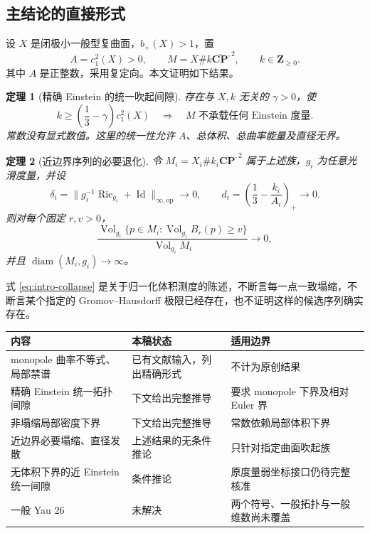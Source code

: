 \documentclass[UTF8,fontset=fandol,zihao=-4]{ctexart}
\theoremstyle{cn}
\newtheorem{theorem}{定理}[section]
\DeclareMathOperator{\Ric}{Ric}
\DeclareMathOperator{\Vol}{Vol}
\DeclareMathOperator{\diam}{diam}
\DeclareMathOperator{\Id}{Id}
\newcommand{\op}{\mathrm{op}}
\numberwithin{equation}{section}
\begin{document}
\subsection{主结论的直接形式}

设 $X$ 是闭极小一般型复曲面，$b_+(X)>1$，置
\[
A=c_1^2(X)>0,\qquad M=X\#k\overline{\mathbf{CP}}^{,2},\qquad k\in\mathbf Z_{\ge0}.
\]
其中 $A$ 是正整数，采用复定向。本文证明如下结果。

\begin{theorem}[精确 Einstein 的统一吹起间隙]\label{thm:intro-exact}
存在与 $X,k$ 无关的 $\gamma>0$，使
\[
k\ge\left(\frac13-\gamma\right)c_1^2(X)
\quad\Longrightarrow\quad
M\text{ 不承载任何 Einstein 度量}.
\]
常数没有显式数值。这里的统一性允许 $A$、总体积、总曲率能量及直径无界。
\end{theorem}

\begin{theorem}[近边界序列的必要退化]\label{thm:intro-collapse}
令 $M_i=X_i\#k_i\overline{\mathbf{CP}}^{,2}$ 属于上述族，$g_i$ 为任意光滑度量，并设
\[
\delta_i=\|g_i^{-1}\Ric_{g_i}+\Id\|_{\infty,\op}\longrightarrow0,
\qquad d_i=\left(\frac13-\frac{k_i}{A_i}\right)_+\longrightarrow0.
\]
则对每个固定 $r,v>0$，
\begin{equation}\label{eq:intro-collapse}
\frac{\Vol_{g_i}\{p\in M_i:\Vol_{g_i}B_r(p)\ge v\}}
{\Vol_{g_i}M_i}\longrightarrow0,
\end{equation}
并且 $\diam(M_i,g_i)\to\infty$。
\end{theorem}

式 \eqref{eq:intro-collapse} 是关于归一化体积测度的陈述，不断言每一点一致塌缩，不断言某个指定的 Gromov--Hausdorff 极限已经存在，也不证明这样的候选序列确实存在。

\begin{longtable}{@{}>{\raggedright\arraybackslash}p{}>{\raggedright\arraybackslash}p{}>{\raggedright\arraybackslash}p{}@{}}
\toprule
内容 & 本稿状态 & 适用边界\\\midrule\endhead
monopole 曲率不等式、局部禁谱 & 已有文献输入，列出精确形式 & 不计为原创结果\\
精确 Einstein 统一拓扑间隙 & 下文给出完整推导 & 要求 monopole 下界及相对 Euler 界\\
非塌缩局部密度下界 & 下文给出完整推导 & 常数依赖局部体积下界\\
近边界必要塌缩、直径发散 & 上述结果的无条件推论 & 只针对指定曲面吹起族\\
无体积下界的近 Einstein 统一间隙 & 条件推论 & 原度量弱坐标接口仍待完整核准\\
一般 Yau 26 & 未解决 & 两个符号、一般拓扑与一般维数尚未覆盖\\
\bottomrule
\end{longtable}
\end{document}

